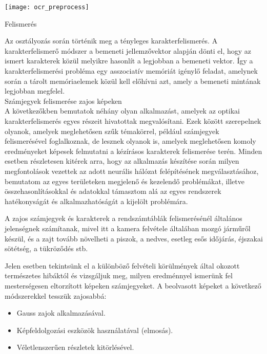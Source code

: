\begin{center}
\texttt{[image: ocr\_preprocess]}
\end{center}

Felismerés

Az osztályozás során történik meg a tényleges karakterfelismerés. A karakterfelismerő módszer a bemeneti jellemzővektor alapján dönti el, hogy az ismert karakterek közül melyikre hasonlít a legjobban a bemeneti vektor. Így a karakterfelismerési probléma egy asszociatív memóriát igénylő feladat, amelynek során a tárolt memóriaelemek közül kell előhívni azt, amely a bemeneti mintának legjobban megfelel.\\

Számjegyek felismerése zajos képeken\\

A következőkben bemutatok néhány olyan alkalmazást, amelyek az optikai karakterfelismerés egyes részeit hivatottak megvalósítani. Ezek között szerepelnek olyanok, amelyek meglehetősen szűk témakörrel, például számjegyek felismerésével foglalkoznak, de lesznek olyanok is, amelyek meglehetősen komoly eredményeket képesek felmutatni a kézírásos karakterek felismerése terén. Minden esetben részletesen kitérek arra, hogy az alkalmazás készítése során milyen megfontolások vezettek az adott neurális hálózat felépítésének megválasztásához, bemutatom az egyes területeken megjelenő és kezelendő problémákat, illetve összehasonlításokkal és adatokkal támasztom alá az egyes rendszerek hatékonyságát és alkalmazhatóságát a kijelölt problémára. 

A zajos számjegyek és karakterek a rendszámtáblák felismerésénél általános jelenségnek számítanak, mivel itt a kamera felvétele általában mozgó járműről készül, és a zajt tovább növelheti a piszok, a nedves, esetleg esős időjárás, éjszakai sötétség, a tükröződés stb.

Jelen esetben tekintsünk el a különböző felvételi körülmények által okozott természetes hibáktól és vizsgáljuk meg, milyen eredménnyel ismerünk fel mesterségesen eltorzított képeken számjegyeket. A beolvasott képeket a következő módszerekkel tesszük zajosabbá: 

\begin{itemize}
\item Gauss zajok alkalmazásával. 
\item Képfeldolgozási eszközök használatával (elmosás). 
\item Véletlenszerűen részletek kitörlésével. 
\end{itemize}

